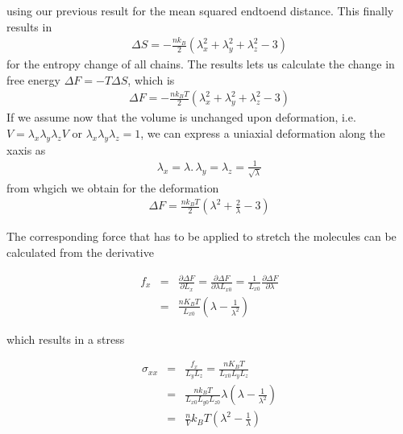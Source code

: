 \documentclass[letterpaper,10pt,english]{sphinxmanual}
\begin{document}
\sphinxAtStartPar
using our previous result for the mean squared end\sphinxhyphen{}to\sphinxhyphen{}end distance. This finally results in
\begin{equation*}
\begin{split}\Delta S=-\frac{n k_B}{2}(\lambda_x^2+\lambda_y^2+\lambda_z^2-3)\end{split}
\end{equation*}
\sphinxAtStartPar
for the entropy change of all chains. The results lets us calculate the change in free energy \(\Delta F=-T \Delta S\), which is
\begin{equation*}
\begin{split}\Delta F=-\frac{n k_B T}{2}(\lambda_x^2+\lambda_y^2+\lambda_z^2-3)\end{split}
\end{equation*}
\sphinxAtStartPar
If we assume now that the volume is unchanged upon deformation, i.e. \(V=\lambda_x\lambda_y\lambda_z V\) or \(\lambda_x\lambda_y\lambda_z=1\), we can express a uniaxial deformation along the x\sphinxhyphen{}axis as
\begin{equation*}
\begin{split}\lambda_x=\lambda.\, \lambda_y=\lambda_z=\frac{1}{\sqrt{\lambda}}\end{split}
\end{equation*}
\sphinxAtStartPar
from whgich we obtain for the deformation
\begin{equation*}
\begin{split}\Delta F= \frac{n k_B T}{2}(\lambda^2+\frac{2}{\lambda}-3)\end{split}
\end{equation*}
\noindent{}

\sphinxAtStartPar
The corresponding force that has to be applied to stretch the molecules can be calculated from the derivative

\sphinxAtStartPar
\begin{eqnarray}
f_x&=&\frac{\partial \Delta F}{\partial L_x}=\frac{\partial \Delta F}{\partial\lambda L_{x0}}=\frac{1}{L_{x0}}\frac{\partial \Delta F}{\partial \lambda}\\
&=&\frac{nK_B T}{L_{x0}}(\lambda-\frac{1}{\lambda^2})
\end{eqnarray}

\sphinxAtStartPar
which results in a stress

\sphinxAtStartPar
\begin{eqnarray}
\sigma_{xx}&=&\frac{f_x}{L_yL_z}=\frac{nK_B T}{L_{x0}L_{y}L_{z}}\\
&=&\frac{nk_B T}{L_{x0}L_{y0}L_{z0}}\lambda\left (\lambda-\frac{1}{\lambda^2}\right )\\
&=&\frac{n}{V}k_B T \left (\lambda^2-\frac{1}{\lambda}\right )
\end{eqnarray}
\end{document}
